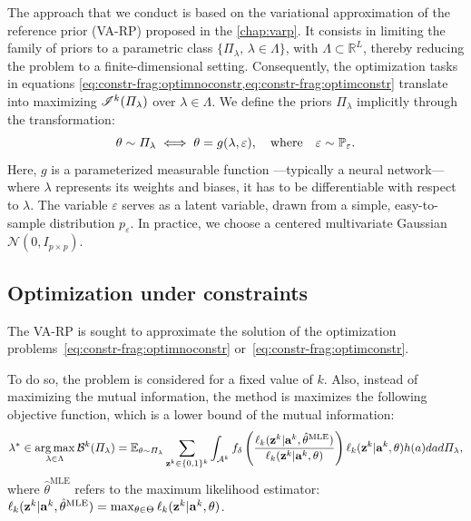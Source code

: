 The approach that we conduct is based on the variational approximation of the reference prior (VA-RP) proposed in the \cref{chap:varp}.
It consists in limiting the family of priors to a parametric class $\{\varPi_\lambda,\,\lambda\in\Lambda\}$, with $\Lambda\subset\mathbb{R}^L$, thereby reducing the problem to a finite-dimensional setting. Consequently, the optimization tasks in equations \cref{eq:constr-frag:optimnoconstr,eq:constr-frag:optimconstr} %
translate into maximizing $\mathscr{I}^k(\varPi_\lambda)$ over $\lambda\in\Lambda$. We define the priors $\varPi_\lambda$ implicitly through the transformation:
\begin{equation}
    \theta \sim \varPi_{\lambda} \iff \theta = g(\lambda,\varepsilon), \quad \text{where} \quad \varepsilon \sim \mathbb{P}_{\varepsilon}.
\end{equation}
Here, $g$ is a parameterized measurable function ---typically a neural network--- where $\lambda$ represents its weights and biases, it has to be differentiable with respect to $\lambda$. The variable $\varepsilon$ serves as a latent variable, drawn from a simple, easy-to-sample distribution ${p}_{\varepsilon}$. In practice, we choose a centered multivariate Gaussian $\mathcal{N}(0,I_{p\times p})$.  














\subsection{Optimization under constraints}\label{sec:constr-frags:subsec:optim}


The VA-RP is sought to approximate the solution of the optimization problems~\eqref{eq:constr-frag:optimnoconstr} or~\eqref{eq:constr-frag:optimconstr}.

To do so, the problem is considered for a fixed value of $k$. 
Also, instead of maximizing the mutual information, the method is maximizes the following objective function, which is a lower bound of the mutual information:
    \begin{equation}
        \lambda^\ast\in\operatorname*{arg\,max}_{\lambda\in\Lambda} \mathcal{B}^k(\varPi_\lambda) = \mathbb{E}_{\theta\sim\varPi_\lambda}\sum_{\mathbf{z}^k\in\{0,1\}^k}\int_{\mathcal{A}^k}f_\delta\left(\frac{\ell_k(\mathbf{z}^k|\mathbf{a}^k,\hat\theta^{\text{MLE}})}{\ell_k(\mathbf{z}^k|\mathbf{a}^k,\theta)}\right) \ell_k(\mathbf{z}^k|\mathbf{a}^k,\theta)h(a)dad\varPi_\lambda,
    \end{equation}
where $\hat\theta^{\text{MLE}}$ refers to the maximum likelihood estimator: $\ell_k(\mathbf{z}^k|\mathbf{a}^k,\hat\theta^{\text{MLE}}) = \max_{\theta\in\Theta}\ell_k(\mathbf{z}^k|\mathbf{a}^k,\theta) $.


